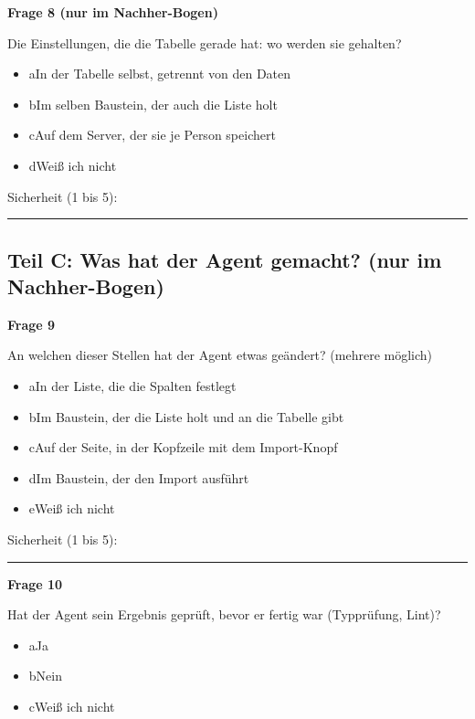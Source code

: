 \medskip

\noindent\begin{minipage}{\linewidth}
\textbf{Frage 8 (nur im Nachher-Bogen)}\par
Die Einstellungen, die die Tabelle gerade hat: wo werden sie gehalten?

\begin{itemize}[nosep,leftmargin=2.4em]
\item[\kreuz] a\quad In der Tabelle selbst, getrennt von den Daten
\item[\kreuz] b\quad Im selben Baustein, der auch die Liste holt
\item[\kreuz] c\quad Auf dem Server, der sie je Person speichert
\item[\kreuz] d\quad Weiß ich nicht
\end{itemize}
\noindent Sicherheit (1 bis 5):~\rule{2.5em}{0.4pt}\par
\end{minipage}

\medskip

\subsection*{Teil C: Was hat der Agent gemacht? (nur im Nachher-Bogen)}

\noindent\begin{minipage}{\linewidth}
\textbf{Frage 9}\par
An welchen dieser Stellen hat der Agent etwas geändert? (mehrere möglich)

\begin{itemize}[nosep,leftmargin=2.4em]
\item[\kreuz] a\quad In der Liste, die die Spalten festlegt
\item[\kreuz] b\quad Im Baustein, der die Liste holt und an die Tabelle gibt
\item[\kreuz] c\quad Auf der Seite, in der Kopfzeile mit dem Import-Knopf
\item[\kreuz] d\quad Im Baustein, der den Import ausführt
\item[\kreuz] e\quad Weiß ich nicht
\end{itemize}
\noindent Sicherheit (1 bis 5):~\rule{2.5em}{0.4pt}\par
\end{minipage}

\medskip

\noindent\begin{minipage}{\linewidth}
\textbf{Frage 10}\par
Hat der Agent sein Ergebnis geprüft, bevor er fertig war (Typprüfung, Lint)?

\begin{itemize}[nosep,leftmargin=2.4em]
\item[\kreuz] a\quad Ja
\item[\kreuz] b\quad Nein
\item[\kreuz] c\quad Weiß ich nicht
\end{itemize}
\end{minipage}

